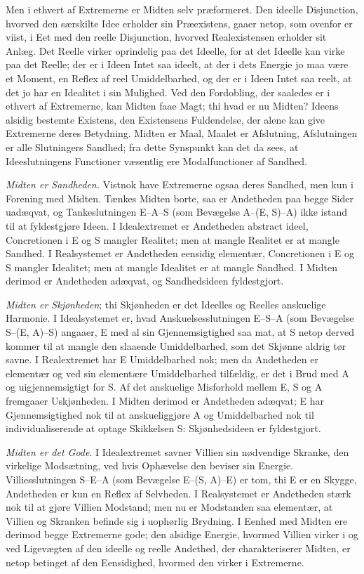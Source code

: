 \documentclass[12pt]{book}
\newcommand{\opage}[1]{\marginnote{\footnotesize\textit{[#1]}}}
\begin{document}
Men i ethvert af Extremerne er Midten selv præformeret. Den ideelle Disjunction, hvorved den særskilte Idee erholder sin Præexistens, gaaer netop, som ovenfor er viist, i Eet med den reelle Disjunction, hvorved Realexistensen erholder sit Anlæg. Det Reelle virker oprindelig paa det Ideelle, for at det Ideelle kan virke paa det Reelle; der er i Ideen Intet
\opage{461}saa ideelt, at der i dets Energie jo maa være et Moment, en Reflex af reel Umiddelbarhed, og der er i Ideen Intet saa reelt, at det jo har en Idealitet i sin Mulighed. Ved den Fordobling, der saaledes er i ethvert af Extremerne, kan Midten faae Magt; thi hvad er nu Midten? Ideens alsidig bestemte Existens, den Existensens Fuldendelse, der alene kan give Extremerne deres Betydning. Midten er Maal, Maalet er Afslutning, Afslutningen er alle Slutningers Sandhed; fra dette Synspunkt kan det da sees, at Ideeslutningens Functioner væsentlig ere Modalfunctioner af Sandhed.

\emph{Midten er Sandheden.} Vistnok have Extremerne ogsaa deres Sandhed, men kun i Forening med Midten. Tænkes Midten borte, saa er Andetheden paa begge Sider uadæqvat, og Tankeslutningen E--A--S (som Bevægelse A--(E, S)--A) ikke istand til at fyldestgjøre Ideen. I Idealextremet er Andetheden abstract ideel, Concretionen i E og S mangler Realitet; men at mangle Realitet er at mangle Sandhed. I Realsystemet er Andetheden eensidig elementær, Concretionen i E og S mangler Idealitet; men at mangle Idealitet er at mangle Sandhed. I Midten derimod er Andetheden adæqvat, og Sandhedsideen fyldestgjort.

\emph{Midten er Skjønheden}; thi Skjønheden er det Ideelles og Reelles anskuelige Harmonie. I Idealsystemet er, hvad Anskuelsesslutningen E--S--A (som Bevægelse S--(E, A)--S) angaaer, E med al sin Gjennemsigtighed saa mat, at S netop derved kommer til at mangle den slaaende Umiddelbarhed, som det Skjønne aldrig tør savne. I Realextremet har E Umiddelbarhed nok; men da Andetheden er elementær og ved sin elementære Umiddelbarhed tilfældig, er det i Brud med A og uigjennemsigtigt for S. Af det anskuelige Misforhold mellem E, S og A fremgaaer Uskjønheden. I Midten derimod er Andetheden adæqvat; E har Gjennemsigtighed nok til at anskueliggjøre A og Umiddelbarhed nok
\opage{462}til individualiserende at optage Skikkelsen S: Skjønhedsideen er fyldestgjort.

\emph{Midten er det Gode}. I Idealextremet savner Villien sin nødvendige Skranke, den virkelige Modsætning, ved hvis Ophævelse den beviser sin Energie. Villiesslutningen S--E--A (som Bevægelse E--(S, A)--E) er tom, thi E er en Skygge, Andetheden er kun en Reflex af Selvheden. I Realsystemet er Andetheden stærk nok til at gjøre Villien Modstand; men nu er Modstanden saa elementær, at Villien og Skranken befinde sig i uophørlig Brydning. I Eenhed med Midten ere derimod begge Extremerne gode; den alsidige Energie, hvormed Villien virker i og ved Ligevægten af den ideelle og reelle Andethed, der charakteriserer Midten, er netop betinget af den Eensidighed, hvormed den virker i Extremerne.
\end{document}
